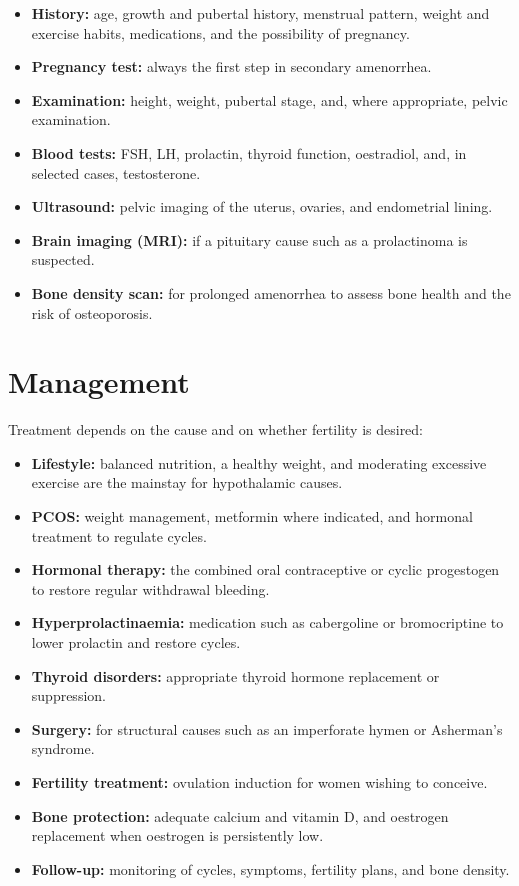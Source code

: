 \begin{itemize}
    \item \textbf{History:} age, growth and pubertal history, menstrual pattern, weight and exercise habits, medications, and the possibility of pregnancy.
    \item \textbf{Pregnancy test:} always the first step in secondary amenorrhea.
    \item \textbf{Examination:} height, weight, pubertal stage, and, where appropriate, pelvic examination.
    \item \textbf{Blood tests:} FSH, LH, prolactin, thyroid function, oestradiol, and, in selected cases, testosterone.
    \item \textbf{Ultrasound:} pelvic imaging of the uterus, ovaries, and endometrial lining.
    \item \textbf{Brain imaging (MRI):} if a pituitary cause such as a prolactinoma is suspected.
    \item \textbf{Bone density scan:} for prolonged amenorrhea to assess bone health and the risk of osteoporosis.
\end{itemize}

\section*{Management}
Treatment depends on the cause and on whether fertility is desired:

\begin{itemize}
    \item \textbf{Lifestyle:} balanced nutrition, a healthy weight, and moderating excessive exercise are the mainstay for hypothalamic causes.
    \item \textbf{PCOS:} weight management, metformin where indicated, and hormonal treatment to regulate cycles.
    \item \textbf{Hormonal therapy:} the combined oral contraceptive or cyclic progestogen to restore regular withdrawal bleeding.
    \item \textbf{Hyperprolactinaemia:} medication such as cabergoline or bromocriptine to lower prolactin and restore cycles.
    \item \textbf{Thyroid disorders:} appropriate thyroid hormone replacement or suppression.
    \item \textbf{Surgery:} for structural causes such as an imperforate hymen or Asherman's syndrome.
    \item \textbf{Fertility treatment:} ovulation induction for women wishing to conceive.
    \item \textbf{Bone protection:} adequate calcium and vitamin D, and oestrogen replacement when oestrogen is persistently low.
    \item \textbf{Follow-up:} monitoring of cycles, symptoms, fertility plans, and bone density.
\end{itemize}

